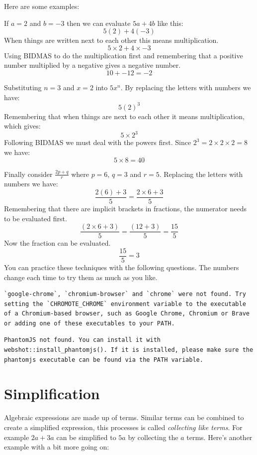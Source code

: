 \documentclass[
  a4paper,
]{scrbook}
\begin{document}
Here are some examples:

If \(a=2\) and \(b=-3\) then we can evaluate \(5a + 4b\) like this: \[
5(2) + 4(-3)
\] When things are written next to each other this means multiplication.
\[
5\times 2 + 4 \times -3
\] Using BIDMAS to do the multiplication first and remembering that a
positive number multiplied by a negative gives a negative number. \[
10 +- 12 = -2
\]

Substituting \(n = 3\) and \(x = 2\) into \(5x^n\). By replacing the
letters with numbers we have: \[
5(2)^3
\] Remembering that when things are next to each other it means
multiplication, which gives: \[
5 \times 2^3
\] Following BIDMAS we must deal with the powers first. Since
\(2^3 = 2 \times 2 \times 2 = 8\) we have: \[
5 \times 8 = 40
\]

Finally consider \(\frac{2p+q}{r}\) where \(p=6\), \(q=3\) and \(r=5\).
Replacing the letters with numbers we have: \[
\frac{2(6)+3}{5} = \frac{2 \times 6+3}{5}
\] Remembering that there are implicit brackets in fractions, the
numerator needs to be evaluated first. \[
\frac{(2 \times 6+3)}{5} = \frac{(12+3)}{5}=\frac{15}{5}
\] Now the fraction can be evaluated. \[
\frac{15}{5} = 3
\] You can practice these techniques with the following questions. The
numbers change each time to try them as much as you like.

\begin{verbatim}
`google-chrome`, `chromium-browser` and `chrome` were not found. Try setting the `CHROMOTE_CHROME` environment variable to the executable of a Chromium-based browser, such as Google Chrome, Chromium or Brave or adding one of these executables to your PATH.
\end{verbatim}

\begin{verbatim}
PhantomJS not found. You can install it with webshot::install_phantomjs(). If it is installed, please make sure the phantomjs executable can be found via the PATH variable.
\end{verbatim}

\section{Simplification}\label{simplification}

Algebraic expressions are made up of terms. Similar terms can be
combined to create a simplified expression, this processes is called
\emph{collecting like terms}. For example \(2a + 3a\) can be simplified
to \(5a\) by collecting the \(a\) terms. Here's another example with a
bit more going on:
\end{document}
